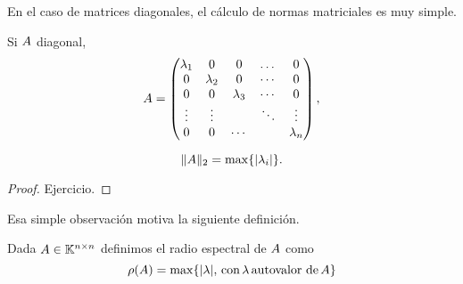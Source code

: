 En el caso de matrices diagonales, el cálculo de normas matriciales es muy simple.

\begin{prop} Si $\Ab$ diagonal,
  $$\Ab=
 \begin{pmatrix}
  \lambda_1&0&0&\dots&0\\
  0&\lambda_2&0&\cdots &0 \\
  0&0&\lambda_3 &\cdots&0 \\
  \vdots&\vdots & &\ddots&\vdots\\
  0&0&\cdots &&\lambda_n
 \end{pmatrix},
 $$

 $$
 \|\Ab\|_2 = \max\{|\lambda_i|\}.
 $$
\end{prop}
\begin{proof}
Ejercicio.
\end{proof}

Esa simple observación motiva la siguiente definición.

\tccdefi
\begin{defi}
 Dada $\Ab\in \Knn$ definimos el radio espectral de $\Ab$ como
 $$
 \rho(\Ab)=\max\{|\lambda|, \, \mbox{con}\, \lambda \,\mbox{autovalor de}\, \Ab\}  
 $$
\end{defi}

